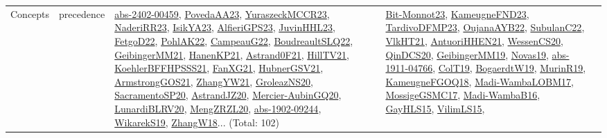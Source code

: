 {\begin{longtable}{lp{3cm}>{\raggedright}p{6cm}>{\raggedright}p{6cm}p{8cm}}
Concepts & precedence & \href{articles/abs-2402-00459.pdf}{abs-2402-00459}\cite{abs-2402-00459}, \href{papers/PovedaAA23.pdf}{PovedaAA23}\cite{PovedaAA23}, \href{articles/YuraszeckMCCR23.pdf}{YuraszeckMCCR23}\cite{YuraszeckMCCR23}, \href{articles/NaderiRR23.pdf}{NaderiRR23}\cite{NaderiRR23}, \href{articles/IsikYA23.pdf}{IsikYA23}\cite{IsikYA23}, \href{articles/AlfieriGPS23.pdf}{AlfieriGPS23}\cite{AlfieriGPS23}, \href{papers/JuvinHHL23.pdf}{JuvinHHL23}\cite{JuvinHHL23}, \href{articles/FetgoD22.pdf}{FetgoD22}\cite{FetgoD22}, \href{articles/PohlAK22.pdf}{PohlAK22}\cite{PohlAK22}, \href{articles/CampeauG22.pdf}{CampeauG22}\cite{CampeauG22}, \href{papers/BoudreaultSLQ22.pdf}{BoudreaultSLQ22}\cite{BoudreaultSLQ22}, \href{papers/GeibingerMM21.pdf}{GeibingerMM21}\cite{GeibingerMM21}, \href{papers/HanenKP21.pdf}{HanenKP21}\cite{HanenKP21}, \href{papers/Astrand0F21.pdf}{Astrand0F21}\cite{Astrand0F21}, \href{papers/HillTV21.pdf}{HillTV21}\cite{HillTV21}, \href{articles/KoehlerBFFHPSSS21.pdf}{KoehlerBFFHPSSS21}\cite{KoehlerBFFHPSSS21}, \href{articles/FanXG21.pdf}{FanXG21}\cite{FanXG21}, \href{articles/HubnerGSV21.pdf}{HubnerGSV21}\cite{HubnerGSV21}, \href{papers/ArmstrongGOS21.pdf}{ArmstrongGOS21}\cite{ArmstrongGOS21}, \href{articles/ZhangYW21.pdf}{ZhangYW21}\cite{ZhangYW21}, \href{papers/GroleazNS20.pdf}{GroleazNS20}\cite{GroleazNS20}, \href{articles/SacramentoSP20.pdf}{SacramentoSP20}\cite{SacramentoSP20}, \href{articles/AstrandJZ20.pdf}{AstrandJZ20}\cite{AstrandJZ20}, \href{papers/Mercier-AubinGQ20.pdf}{Mercier-AubinGQ20}\cite{Mercier-AubinGQ20}, \href{articles/LunardiBLRV20.pdf}{LunardiBLRV20}\cite{LunardiBLRV20}, \href{articles/MengZRZL20.pdf}{MengZRZL20}\cite{MengZRZL20}, \href{articles/abs-1902-09244.pdf}{abs-1902-09244}\cite{abs-1902-09244}, \href{articles/WikarekS19.pdf}{WikarekS19}\cite{WikarekS19}, \href{articles/ZhangW18.pdf}{ZhangW18}\cite{ZhangW18}... (Total: 102) & \href{papers/Bit-Monnot23.pdf}{Bit-Monnot23}\cite{Bit-Monnot23}, \href{papers/KameugneFND23.pdf}{KameugneFND23}\cite{KameugneFND23}, \href{papers/TardivoDFMP23.pdf}{TardivoDFMP23}\cite{TardivoDFMP23}, \href{papers/OujanaAYB22.pdf}{OujanaAYB22}\cite{OujanaAYB22}, \href{articles/SubulanC22.pdf}{SubulanC22}\cite{SubulanC22}, \href{articles/VlkHT21.pdf}{VlkHT21}\cite{VlkHT21}, \href{papers/AntuoriHHEN21.pdf}{AntuoriHHEN21}\cite{AntuoriHHEN21}, \href{papers/WessenCS20.pdf}{WessenCS20}\cite{WessenCS20}, \href{articles/QinDCS20.pdf}{QinDCS20}\cite{QinDCS20}, \href{papers/GeibingerMM19.pdf}{GeibingerMM19}\cite{GeibingerMM19}, \href{articles/Novas19.pdf}{Novas19}\cite{Novas19}, \href{articles/abs-1911-04766.pdf}{abs-1911-04766}\cite{abs-1911-04766}, \href{papers/ColT19.pdf}{ColT19}\cite{ColT19}, \href{papers/BogaerdtW19.pdf}{BogaerdtW19}\cite{BogaerdtW19}, \href{papers/MurinR19.pdf}{MurinR19}\cite{MurinR19}, \href{papers/KameugneFGOQ18.pdf}{KameugneFGOQ18}\cite{KameugneFGOQ18}, \href{papers/Madi-WambaLOBM17.pdf}{Madi-WambaLOBM17}\cite{Madi-WambaLOBM17}, \href{papers/MossigeGSMC17.pdf}{MossigeGSMC17}\cite{MossigeGSMC17}, \href{papers/Madi-WambaB16.pdf}{Madi-WambaB16}\cite{Madi-WambaB16}, \href{papers/GayHLS15.pdf}{GayHLS15}\cite{GayHLS15}, \href{papers/VilimLS15.pdf}{VilimLS15}\cite{VilimLS15}, 
\end{longtable}}
